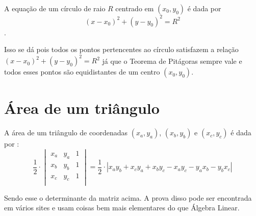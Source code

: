 \documentclass{article}
\begin{document}
A equação de um círculo de raio $R$ centrado em $(x_0, y_0)$ é dada por $$(x-x_0)^2 + (y-y_0)^2 = R^2$$.
\begin{center}
\end{center}

Isso se dá pois todos os pontos pertencentes ao círculo satisfazem a relação $(x - x_0)^2 + (y-y_0)^2 = R^2$ já que o Teorema de Pitágoras sempre vale e todos esses pontos são equidistantes de um centro $(x_0, y_0)$.

\section{Área de um triângulo}

A área de um triângulo de coordenadas $(x_a,y_a)$, $(x_b, y_b)$ e $(x_c,y_c)$ é dada por :
$$
\frac{1}{2} \cdot 
\begin{vmatrix}
x_a & y_a & 1 \\
  x_b & y_b & 1 \\
  x_c & y_c & 1 \\
\end{vmatrix}
= 
\frac{1}{2} \cdot |x_ay_b + x_c  y_a + x_b y_c - x_a y_c - y_a x_b - y_b x_c|
$$

Sendo esse o determinante da matriz acima. A prova disso pode ser encontrada em vários sites e usam coisas bem mais elementares do que Álgebra Linear.
\end{document}

